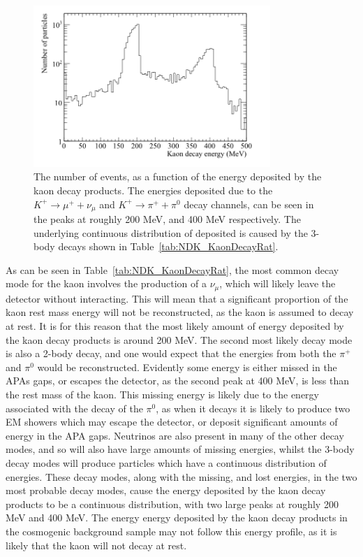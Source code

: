 \begin{figure}
  \centering
  \includegraphics[width=0.8\textwidth]{NucleonDecay_KaonDecayEnergy}
  \caption[The number of events, as a function of the energy deposited by the kaon decay products.]
          {The number of events, as a function of the energy deposited by the kaon decay products. The energies deposited due to the $K^{+} \rightarrow \mu^{+} + \nu_{\mu}$ and $K^{+} \rightarrow \pi^{+} + \pi^{0}$ decay channels, can be seen in the peaks at roughly 200 MeV, and 400 MeV respectively. The underlying continuous distribution of deposited is caused by the 3-body decays shown in Table~\ref{tab:NDK_KaonDecayRat}.}
  \label{fig:NDK_KaonDecayEn}
\end{figure}

As can be seen in Table~\ref{tab:NDK_KaonDecayRat}, the most common decay mode for the kaon involves the production of a $\nu_{\mu}$, which will likely leave the detector without interacting. This will mean that a significant proportion of the kaon rest mass energy will not be reconstructed, as the kaon is assumed to decay at rest. It is for this reason that the most likely amount of energy deposited by the kaon decay products is around 200 MeV. The second most likely decay mode is also a 2-body decay, and one would expect that the energies from both the $\pi^{+}$ and $\pi^{0}$ would be reconstructed. Evidently some energy is either missed in the APAs gaps, or escapes the detector, as the second peak at 400 MeV, is less than the rest mass of the kaon. This missing energy is likely due to the energy associated with the decay of the $\pi^0$, as when it decays it is likely to produce two EM showers which may escape the detector, or deposit significant amounts of energy in the APA gaps. Neutrinos are also present in many of the other decay modes, and so will also have large amounts of missing energies, whilst the 3-body decay modes will produce particles which have a continuous distribution of energies. These decay modes, along with the missing, and lost energies, in the two most probable decay modes, cause the energy deposited by the kaon decay products to be a continuous distribution, with two large peaks at roughly 200 MeV and 400 MeV. The energy energy deposited by the kaon decay products in the cosmogenic background sample may not follow this energy profile, as it is likely that the kaon will not decay at rest. \\

